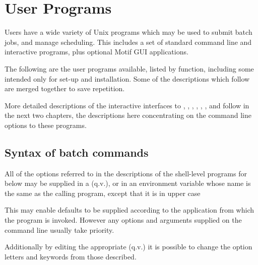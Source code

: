 \chapter{User Programs}
\label{chp:user-programs}
\label{bkm:Userprograms}Users have a wide variety of Unix programs which may be used to submit batch jobs, and manage scheduling. This includes
a set of standard command line and interactive programs, plus optional Motif GUI applications.

The following are the user programs available, listed by function, including some intended only for set-up and installation. Some of the
descriptions which follow are merged together to save repetition.

More detailed descriptions of the interactive interfaces to \PrBtq{}, \PrBtuser, \PrXbtq{}, \PrXbtr{}, \PrXbtuser{}, \PrXmbtq{},
\PrXmbtr{} and \PrXmbtuser{} follow in the next two chapters, the descriptions here concentrating on the
command line options to these programs.

\section{Syntax of batch commands}
All of the options referred to in the descriptions of the shell-level programs for \ProductName{} below may be supplied
in a  (q.v.), or in an environment variable whose name is the same as the calling program,
except that it is in upper case


This may enable defaults to be supplied according to the application from which the program is invoked. However any options and arguments
supplied on the command line usually take priority.

Additionally by editing the appropriate  (q.v.) it is possible to change the option letters and keywords from
those described.


